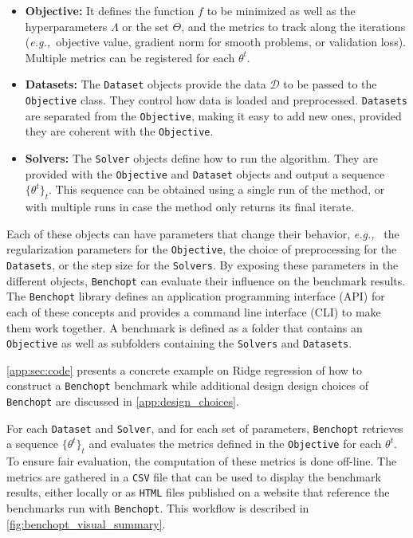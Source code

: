 \documentclass{article}
\newcommand{\eg}{{\em e.g.,~}}
\newcommand{\rebuttal}[1]{#1}
\newcommand{\Benchopt}{{{\texttt{Benchopt}}}}
\begin{document}
\vspace*{-3mm}\begin{itemize}[topsep=0pt,itemsep=1ex,partopsep=0ex,parsep=0ex,leftmargin=2ex]
    \item[] \textbf{Objective:}
    It defines the function $f$ to be minimized
    as well as the hyperparameters $\Lambda$ or the set $\Theta$,
    and the metrics to track along the iterations (\eg objective value, gradient norm for smooth problems, or validation loss).
    Multiple metrics can be registered for each $\theta^t$.

    \item[]\textbf{Datasets:}
    The \texttt{Dataset} objects provide the data $\mathcal D$ to be passed to the \texttt{Objective} class.
    They control how data is loaded and preprocessed.
    \texttt{Datasets} are separated from the \texttt{Objective}, making it easy to add new ones, provided they are coherent with the \texttt{Objective}.

    \item[]\textbf{Solvers:}
    The \texttt{Solver} objects define how to run the algorithm.
    They are provided with the \texttt{Objective} and \texttt{Dataset} objects and output a sequence $\{\theta^t\}_t$.
    This sequence can be obtained using a single run of the method, or with multiple runs in case the method only returns its final iterate.
\end{itemize}


Each of these objects can have parameters that change their behavior, \eg{} the regularization parameters for the \texttt{Objective}, the choice of preprocessing for the \texttt{Datasets}, or the step size for the \texttt{Solvers}.
By exposing these parameters in the different objects, \Benchopt{} can evaluate their influence on the benchmark results.
The \Benchopt{} library defines an application programming interface (API) for each of these concepts and provides a command line interface (CLI) to make them work together.
A benchmark is defined as a folder that contains an \texttt{Objective} as well as subfolders containing the \texttt{Solvers} and \texttt{Datasets}.
\rebuttal{
\autoref{app:sec:code} presents a concrete example on Ridge regression of how to construct a \Benchopt{} benchmark while additional design design choices of \Benchopt{} are discussed in \autoref{app:design_choices}.
}


For each \texttt{Dataset} and \texttt{Solver}, and for each set of parameters, \Benchopt{} retrieves a sequence $\{\theta^t\}_t$ and evaluates
the metrics defined in the \texttt{Objective} for each $\theta^t$.
To ensure fair evaluation, the computation of these metrics is done off-line.
The metrics are gathered in a \texttt{CSV} file that can be used to display the benchmark results, either locally or
as \texttt{HTML} files published on a website that reference the benchmarks run with \Benchopt{}.
This workflow is described in \autoref{fig:benchopt_visual_summary}.
\end{document}
